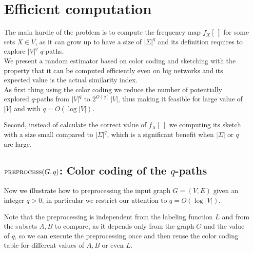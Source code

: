 \clearpage

\section{Efficient computation}

The main hurdle of the problem is to compute the frequency map $f_{X}[\ ]$ for some sets $X \in V$,
as it can grow up to have a size of $|\Sigma|^{q}$ and its definition requires to explore $|V|^{q}$ $q$-paths.\\

We present a random estimator based on color coding and sketching with the property that it can be computed
efficiently even on big networks and its expected value is the actual similarity index\cite{SubSim}.\\

As first thing using the color coding we reduce the number of potentially explored $q$-paths from $|V|^{q}$ to $2^{O(q)}|V|$, 
thus making it feasible for large value of $|V|$ and with $q = O(\log |V|)$.

Second, instead of calculate the correct value of $f_{X}[\ ]$ we computing its sketch with a size small compared to $|\Sigma|^{q}$,
which is a significant benefit when $|\Sigma|$ or $q$ are large.

\subsection*{$\textsc{preprocess}(G,q)$: Color coding of the $q$-paths}

Now we illustrate how to preprocessing the input graph $G=(V,E)$ given an integer $q > 0$, in particular we restrict our attention to $q = O(\log |V|)$.

Note that the preprocessing is independent from the labeling function $L$ and from the subsets $A,B$ to compare, 
as it depends only from the graph $G$ and the value of $q$, so we can execute the preprocessing once and 
then reuse the color coding table for different values of $A,B$ or even $L$.\\

